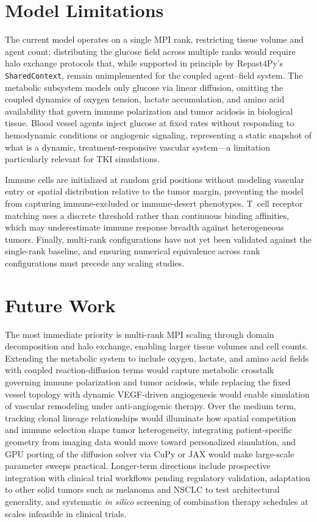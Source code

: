 \section{Model Limitations}
\label{sec:limitations}

The current model operates on a single MPI rank, restricting tissue volume and agent count; distributing the glucose field across multiple ranks would require halo exchange protocols that, while supported in principle by Repast4Py's \texttt{SharedContext}, remain unimplemented for the coupled agent--field system. The metabolic subsystem models only glucose via linear diffusion, omitting the coupled dynamics of oxygen tension, lactate accumulation, and amino acid availability that govern immune polarization and tumor acidosis in biological tissue. Blood vessel agents inject glucose at fixed rates without responding to hemodynamic conditions or angiogenic signaling, representing a static snapshot of what is a dynamic, treatment-responsive vascular system---a limitation particularly relevant for TKI simulations.

Immune cells are initialized at random grid positions without modeling vascular entry or spatial distribution relative to the tumor margin, preventing the model from capturing immune-excluded or immune-desert phenotypes. T~cell receptor matching uses a discrete threshold rather than continuous binding affinities, which may underestimate immune response breadth against heterogeneous tumors. Finally, multi-rank configurations have not yet been validated against the single-rank baseline, and ensuring numerical equivalence across rank configurations must precede any scaling studies.

\section{Future Work}
\label{sec:future-work}

The most immediate priority is multi-rank MPI scaling through domain decomposition and halo exchange, enabling larger tissue volumes and cell counts. Extending the metabolic system to include oxygen, lactate, and amino acid fields with coupled reaction-diffusion terms would capture metabolic crosstalk governing immune polarization and tumor acidosis, while replacing the fixed vessel topology with dynamic VEGF-driven angiogenesis would enable simulation of vascular remodeling under anti-angiogenic therapy. Over the medium term, tracking clonal lineage relationships would illuminate how spatial competition and immune selection shape tumor heterogeneity, integrating patient-specific geometry from imaging data would move toward personalized simulation, and GPU porting of the diffusion solver via CuPy or JAX would make large-scale parameter sweeps practical. Longer-term directions include prospective integration with clinical trial workflows pending regulatory validation, adaptation to other solid tumors such as melanoma and NSCLC to test architectural generality, and systematic \emph{in silico} screening of combination therapy schedules at scales infeasible in clinical trials.

